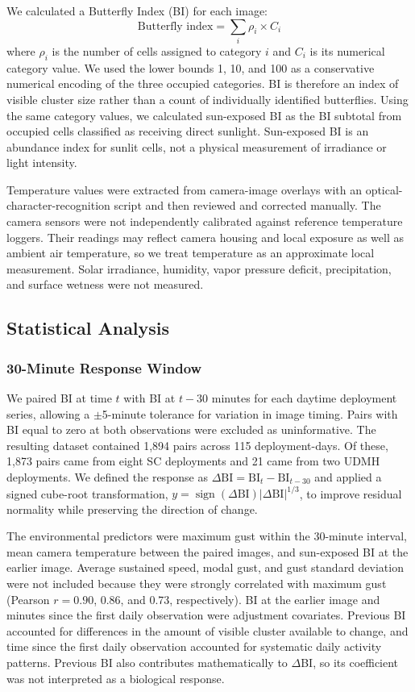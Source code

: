 \documentclass[insects,article,submit,pdftex,moreauthors]{Definitions/mdpi}
\begin{document}
We calculated a Butterfly Index (BI) for each image:
\begin{equation}
\text{Butterfly index} = \sum_{i} \rho_{i} \times C_{i}
\end{equation}
where $\rho_{i}$ is the number of cells assigned to category $i$ and $C_{i}$ is its numerical category value. We used the lower bounds 1, 10, and 100 as a conservative numerical encoding of the three occupied categories. BI is therefore an index of visible cluster size rather than a count of individually identified butterflies. Using the same category values, we calculated sun-exposed BI as the BI subtotal from occupied cells classified as receiving direct sunlight. Sun-exposed BI is an abundance index for sunlit cells, not a physical measurement of irradiance or light intensity.

Temperature values were extracted from camera-image overlays with an optical-character-recognition script and then reviewed and corrected manually. The camera sensors were not independently calibrated against reference temperature loggers. Their readings may reflect camera housing and local exposure as well as ambient air temperature, so we treat temperature as an approximate local measurement. Solar irradiance, humidity, vapor pressure deficit, precipitation, and surface wetness were not measured.

\subsection{Statistical Analysis}

\subsubsection{30-Minute Response Window}

We paired BI at time $t$ with BI at $t-30$ minutes for each daytime deployment series, allowing a $\pm$5-minute tolerance for variation in image timing. Pairs with BI equal to zero at both observations were excluded as uninformative. The resulting dataset contained 1,894 pairs across 115 deployment-days. Of these, 1,873 pairs came from eight SC deployments and 21 came from two UDMH deployments. We defined the response as $\Delta\mathrm{BI}=\mathrm{BI}_{t}-\mathrm{BI}_{t-30}$ and applied a signed cube-root transformation, $y=\operatorname{sign}(\Delta\mathrm{BI})|\Delta\mathrm{BI}|^{1/3}$, to improve residual normality while preserving the direction of change.

The environmental predictors were maximum gust within the 30-minute interval, mean camera temperature between the paired images, and sun-exposed BI at the earlier image. Average sustained speed, modal gust, and gust standard deviation were not included because they were strongly correlated with maximum gust (Pearson $r=0.90$, 0.86, and 0.73, respectively). BI at the earlier image and minutes since the first daily observation were adjustment covariates. Previous BI accounted for differences in the amount of visible cluster available to change, and time since the first daily observation accounted for systematic daily activity patterns. Previous BI also contributes mathematically to $\Delta$BI, so its coefficient was not interpreted as a biological response.
\end{document}

